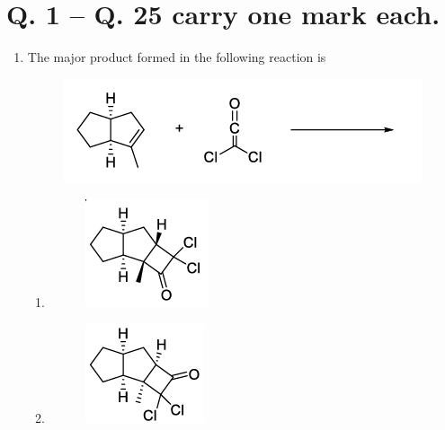 \documentclass{article}
\begin{document}
\section*{Q. 1 – Q. 25 carry one mark each. }
\begin{enumerate}

\item The major product formed in the following reaction is  

\begin{figure}[H]
\centering
\includegraphics[width=0.5\columnwidth]{figures/cy_q1.png}
\end{figure}

\begin{multicols}{2}
    \begin{enumerate}
        \item \begin{figure}[H]
            \centering
            \includegraphics[width=0.5\columnwidth]{figures/cy_q1a.png}
            \label{fig:placeholder}
        \end{figure}

        \item \begin{figure}[H]
            \centering
            \includegraphics[width=0.5\columnwidth]{figures/cy_q1b.png}
            \label{fig:placeholder}
        \end{figure}


\end{enumerate}
\end{multicols}
\end{enumerate}
\end{document}
